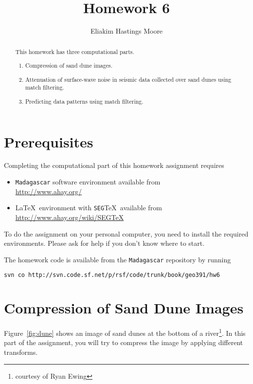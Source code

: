 \author{Eliakim Hastings Moore}
\title{Homework 6}

\begin{abstract}
  This homework has three computational parts. 
  \begin{enumerate}
  \item Compression of sand dune images.
  \item Attenuation of surface-wave noise in 
        seismic data collected over sand dunes using match filtering.
  \item Predicting data patterns using match filtering.
  \end{enumerate}
\end{abstract}

\section{Prerequisites}

Completing the computational part of this homework assignment requires
\begin{itemize}
\item \texttt{Madagascar} software environment available from \\
\url{http://www.ahay.org/}
\item \LaTeX\ environment with \texttt{SEG}\TeX\ available from \\ 
\url{http://www.ahay.org/wiki/SEGTeX}
\end{itemize}
To do the assignment on your personal computer, you need to install
the required environments. Please ask for help if you don't know where
to start.

The homework code is available from the \texttt{Madagascar} repository
by running
\begin{verbatim}
svn co http://svn.code.sf.net/p/rsf/code/trunk/book/geo391/hw6
\end{verbatim}

\section{Compression of Sand Dune Images}


Figure~\ref{fig:dune} shows an image of sand dunes at the bottom of a
river\footnote{courtesy of Ryan Ewing}. In this part of the assignment, you
will try to compress the image by applying different transforms.

